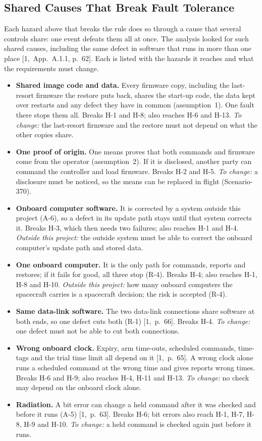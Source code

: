 \documentclass[11pt,a4paper]{article}
\begin{document}
\subsection{Shared Causes That Break Fault Tolerance}
Each hazard above that breaks the rule does so through a cause that several
controls share: one event defeats them all at once. The analysis looked for such shared causes,
including the same defect in software that runs in more than one place
[1,~App.~A.1.1, p.~62]. Each is listed with the hazards it reaches and what the
requirements must change.
\begin{itemize}
\item \textbf{Shared image code and data.} Every firmware copy, including the
  last-resort firmware the restore puts back, shares the start-up code, the
  data kept over restarts and any defect they have in common (assumption~1).
  One fault there stops them all. Breaks H-1 and H-8; also reaches H-6 and
  H-13. \textit{To change:} the last-resort firmware and the restore must not
  depend on what the other copies share.
\item \textbf{One proof of origin.} One means proves that both commands and
  firmware come from the operator (assumption~2). If it is disclosed, another
  party can command the controller and load firmware. Breaks H-2 and H-5.
  \textit{To change:} a disclosure must be noticed, so the means can be
  replaced in flight (Scenario-370).
\item \textbf{Onboard computer software.} It is corrected by a system outside
  this project (A-6), so a defect in its update path stays until that system
  corrects it. Breaks H-3, which then needs two failures; also reaches H-1 and
  H-4. \textit{Outside this project:} the outside system must be able to
  correct the onboard computer's update path and stored data.
\item \textbf{One onboard computer.} It is the only path for commands, reports
  and restores; if it fails for good, all three stop (R-4). Breaks H-4; also
  reaches H-1, H-8 and H-10. \textit{Outside this project:} how many onboard
  computers the spacecraft carries is a spacecraft decision; the risk is
  accepted (R-4).
\item \textbf{Same data-link software.} The two data-link connections share
  software at both ends, so one defect cuts both (R-1) [1,~p.~66]. Breaks H-4.
  \textit{To change:} one defect must not be able to cut both connections.
\item \textbf{Wrong onboard clock.} Expiry, arm time-outs, scheduled commands,
  time-tags and the trial time limit all depend on it [1,~p.~65]. A wrong
  clock alone runs a scheduled command at the wrong time and gives reports
  wrong times. Breaks H-6 and H-9; also reaches H-4, H-11 and H-13.
  \textit{To change:} no check may depend on the onboard clock alone.
\item \textbf{Radiation.} A bit error can change a held command after it was
  checked and before it runs (A-5) [1,~p.~63]. Breaks H-6; bit errors also
  reach H-1, H-7, H-8, H-9 and H-10. \textit{To change:} a held command is
  checked again just before it runs.
\end{itemize}
\end{document}
